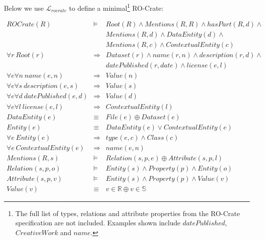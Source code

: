 Below we use $\mathcal{L}_{rocrate}$ to define a minimal\footnote{
    The full list of types, relations and attribute properties from the RO-Crate specification are not included. Examples shown include $datePublished$, $CreativeWork$ and $name$.
} RO-Crate:


\begin{eqnarray*}
ROCrate(R)                                  & \models & Root(R) \land Mentions(R, R) \land hasPart(R, d) \land \\
                                            & & Mentions(R, d) \land DataEntity(d) \land \\
                                            & & Mentions(R, c) \land ContextualEntity(c) \\
\forall r \ Root(r)                         & \Rightarrow & Dataset(r) \land name(r, n) \land description(r, d) \land \\
                                            & &             datePublished(r, date) \land license(e, l) \\
\forall e \forall n \ name(e, n)            & \Rightarrow & Value(n) \\
\forall e \forall s \ description(e, s)     & \Rightarrow & Value(s) \\
\forall e \forall d \ datePublished(e, d)   & \Rightarrow & Value(d) \\
\forall e \forall l \ license(e, l)         & \Rightarrow & ContextualEntity(l) \\
DataEntity(e)                               & \equiv &      File(e) \oplus Dataset(e) \\
Entity(e)                                   & \equiv &      DataEntity(e) \lor ContextualEntity(e) \\
\forall e \ Entity(e)                       & \Rightarrow & type(e, c) \land Class(c) \\
\forall e \ ContextualEntity(e)             & \Rightarrow & name(e, n)  \\
Mentions(R, s)                              & \models &     Relation(s, p, e) \oplus Attribute(s,  p, l) \\
Relation(s, p, o)                           & \models &     Entity(s) \land Property(p) \land  Entity(o) \\
Attribute(s, p, v)                          & \models &     Entity(s) \land Property(p) \land Value(v) \\
Value(v)                                    & \equiv &      v \in \mathbb{R} \oplus v \in \mathbb{S}
\end{eqnarray*}

